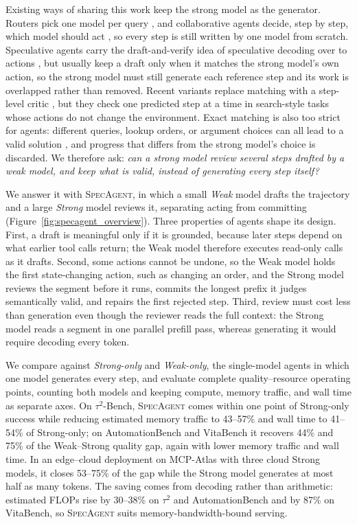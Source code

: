 \documentclass[11pt, copyright, logo, secondlogo]{template/lark}
\newcommand{\SpecAgent}{\textsc{SpecAgent}\xspace}
\begin{document}
Existing ways of sharing this work keep the strong model as the generator.
Routers pick one model per query
\citep{chen2023frugalgpt,aggarwal2024automix,ding2024hybridllm,ong2024routellm},
and collaborative agents decide, step by step, which model should act
\citep{gao2026agentcollab}, so every step is still written by one model from scratch. Speculative agents
carry the draft-and-verify idea of speculative decoding
\citep{leviathan2023speculative} over to actions
\citep{hua2024isp,ye2026specactions}, but usually keep a draft only when it matches the
strong model's own action, so the strong model must still generate each
reference step and its work is overlapped rather than removed. Recent variants
replace matching with a step-level critic
\citep{huang2025spagent,zhong2026dualspec}, but they check one predicted step
at a time in search-style tasks whose actions do not change the environment. Exact matching is also
too strict for agents: different queries, lookup orders, or argument choices
can all lead to a valid solution \citep{liu2026schemabias}, and progress that differs from the strong
model's choice is discarded. We therefore ask: \emph{can a
strong model review several steps drafted by a weak model, and keep what is
valid, instead of generating every step itself?}

We answer it with \SpecAgent{}, in which a small \emph{Weak} model drafts the
trajectory and a large \emph{Strong} model reviews it, separating acting from
committing (Figure~\ref{fig:specagent_overview}). Three properties of agents shape its
design. First, a draft is meaningful only if it is grounded, because later
steps depend on what earlier tool calls return; the Weak model therefore
executes read-only calls as it drafts. Second, some actions cannot be undone,
so the Weak model holds the first state-changing action, such as changing an
order, and the Strong model reviews the segment before
it runs, commits the longest prefix it judges semantically valid, and repairs
the first rejected step. Third, review must cost less than generation even
though the reviewer reads the full context: the Strong model reads a segment
in one parallel prefill pass, whereas generating it would require decoding
every token.

We compare against \emph{Strong-only} and \emph{Weak-only}, the single-model
agents in which one model generates every step, and evaluate complete
quality--resource operating points, counting both models and keeping compute,
memory traffic, and wall time as separate axes. On
$\tau^2$-Bench, \SpecAgent{} comes within one point of Strong-only success
while reducing estimated memory traffic to 43--57\% and wall time to
41--54\% of Strong-only; on AutomationBench and VitaBench it recovers 44\% and 75\% of the
Weak--Strong quality gap, again with lower memory traffic and wall time. In an
edge--cloud deployment on MCP-Atlas with three cloud Strong models, it closes
53--75\% of the gap while the Strong model generates at most half as many
tokens. The saving comes from decoding rather than arithmetic: estimated FLOPs
rise by 30--38\% on $\tau^2$ and AutomationBench and by 87\% on VitaBench, so \SpecAgent{} suits memory-bandwidth-bound serving.
\end{document}
